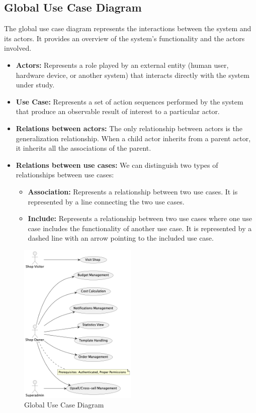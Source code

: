 \subsection{Global Use Case Diagram}
The global use case diagram represents the interactions between the system and its actors. It provides an overview of the system's functionality and the actors involved.
\begin{itemize}
    \item \textbf{Actors:} Represents a role played by an external entity (human user, hardware device, or another system) that interacts directly with the system under study.
    \item \textbf{Use Case:} Represents a set of action sequences performed by the system that produce an observable result of interest to a particular actor.
    \item \textbf{Relations between actors:} The only relationship between actors is the generalization relationship. When a child actor inherits from a parent actor, it inherits all the associations of the parent.
    \item \textbf{Relations between use cases:} We can distinguish two types of relationships between use cases:
    \begin{itemize}
        \item \textbf{Association:} Represents a relationship between two use cases. It is represented by a line connecting the two use cases.
        \item \textbf{Include:} Represents a relationship between two use cases where one use case includes the functionality of another use case. It is represented by a dashed line with an arrow pointing to the included use case.
    \end{itemize}
\end{itemize}

\begin{figure}[H]
    \centering
    \includegraphics[width=0.5\textwidth]{Images/globalUseCase.png}
    \caption{Global Use Case Diagram}
    \label{fig:use_case_diagram}
\end{figure}

